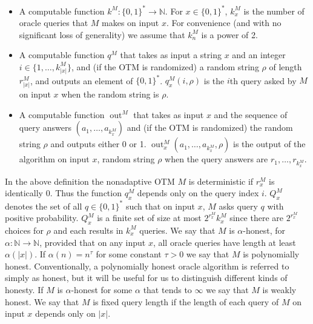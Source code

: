 \documentclass[10pt,a4paper]{article}
\begin{document}
\begin{itemize}
\item A computable function $k^M:\{0,1\}^*\to\mathbb N$. For $x\in\{0,1\}^*$, $k_x^M$ is the number of oracle queries that $M$ makes on input $x$. For convenience (and with no significant loss of generality) we assume that $k_n^M$ is a power of 2.
\item A computable function $q^M$ that takes as input a string $x$ and an integer $i\in\{1,\ldots,k_{|x|}^M\}$, and (if the OTM is randomized) a random string $\rho$ of length $r_{|x|}^M$, and outputs an element of $\{0,1\}^*$. $q_x^M(i,\rho)$ is the $i$th query asked by $M$ on input $x$ when the random string is $\rho$.
\item A computable function $\operatorname{out}^M$ that takes as input $x$ and the sequence of query answers $(a_1,\ldots,a_{k_x^M})$ and (if the OTM is randomized) the random string $\rho$ and outputs either 0 or 1. $\operatorname{out}_x^M(a_1,\ldots,a_{k_x^M},\rho)$ is the output of the algorithm on input $x$, random string $\rho$ when the query answers are $r_1,\ldots,r_{k_x^M}$.
\end{itemize}
In the above definition the nonadaptive OTM $M$ is deterministic if $r_x^M$ is identically 0. Thus the function $q_x^M$ depends only on the query index $i$.
$Q_x^M$ denotes the set of all $q\in\{0,1\}^*$ such that on input $x$, $M$ asks query $q$ with positive probability. $Q_x^M$ is a finite set of size at most $2^{r_x^M}k_x^M$ since there are $2^{r_x^M}$ choices for $\rho$ and each results in $k_x^M$ queries.
We say that $M$ is $\alpha$-honest, for $\alpha:\mathbb N\to\mathbb N$, provided that on any input $x$, all oracle queries have length at least $\alpha(|x|)$. If $\alpha(n)=n^\tau$ for some constant $\tau>0$ we say that $M$ is polynomially honest. Conventionally, a polynomially honest oracle algorithm is referred to simply as honest, but it will be useful for us to distinguish different kinds of honesty.
If $M$ is $\alpha$-honest for some $\alpha$ that tends to $\infty$ we say that $M$ is weakly honest. We say that $M$ is fixed query length if the length of each query of $M$ on input $x$ depends only on $|x|$.
\end{document}
